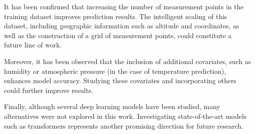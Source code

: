It has been confirmed that increasing the number of measurement points in the training dataset improves prediction results.
The intelligent scaling of this dataset, including geographic information such as altitude and coordinates, as well as the construction of a grid of measurement points, could constitute a future line of work.

Moreover, it has been observed that the inclusion of additional covariates, such as humidity or atmospheric pressure (in the case of temperature prediction), enhances model accuracy.
Studying these covariates and incorporating others could further improve results.

Finally, although several deep learning models have been studied, many alternatives were not explored in this work.
Investigating state-of-the-art models such as transformers represents another promising direction for future research.